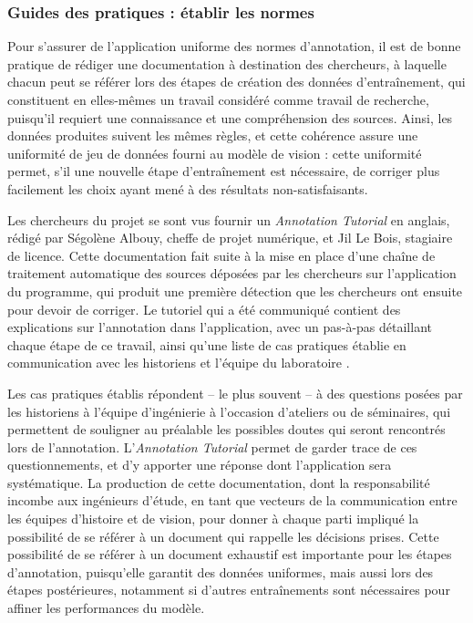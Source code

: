     \subsubsection{Guides des pratiques : établir les normes}
	Pour s'assurer de l'application uniforme des normes d'annotation, il est de bonne pratique de rédiger une documentation à destination des chercheurs, à laquelle chacun peut se référer lors des étapes de création des données d'entraînement, qui constituent en elles-mêmes un travail considéré comme travail de recherche, puisqu'il requiert une connaissance et une compréhension des sources. Ainsi, les données produites suivent les mêmes règles, et cette cohérence assure une uniformité de jeu de données fourni au modèle de vision : cette uniformité permet, s'il une nouvelle étape d'entraînement est nécessaire, de corriger plus facilement les choix ayant mené à des résultats non-satisfaisants.
	
	Les chercheurs du projet \eida se sont vus fournir un \textit{Annotation Tutorial} en anglais, rédigé par Ségolène Albouy, cheffe de projet numérique, et Jil Le Bois, stagiaire de licence. Cette documentation fait suite à la mise en place d'une chaîne de traitement automatique des sources déposées par les chercheurs sur l'application du programme, qui produit une première détection que les chercheurs ont ensuite pour devoir de corriger. Le tutoriel qui a été communiqué contient des explications sur l'annotation dans l'application, avec un pas-à-pas détaillant chaque étape de ce travail, ainsi qu'une liste de cas pratiques établie en communication avec les historiens et l'équipe du laboratoire \imagine.
	
	Les cas pratiques établis répondent -- le plus souvent -- à des questions posées par les historiens à l'équipe d'ingénierie à l'occasion d'ateliers ou de séminaires, qui permettent de souligner au préalable les possibles doutes qui seront rencontrés lors de l'annotation. L'\textit{Annotation Tutorial} permet de garder trace de ces questionnements, et d'y apporter une réponse dont l'application sera systématique. La production de cette documentation, dont la responsabilité incombe aux ingénieurs d'étude, en tant que vecteurs de la communication entre les équipes d'histoire et de vision, pour donner à chaque parti impliqué la possibilité de se référer à un document qui rappelle les décisions prises. Cette possibilité de se référer à un document exhaustif est importante pour les étapes d'annotation, puisqu'elle garantit des données uniformes, mais aussi lors des étapes postérieures, notamment si d'autres entraînements sont nécessaires pour affiner les performances du modèle.
